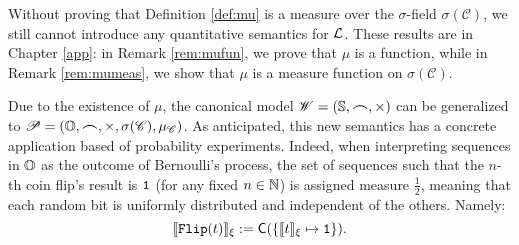 Without proving that Definition \ref{def:mu} is a measure over the $\sigma$-field
$\sigma(\mathscr C)$, we still cannot introduce any quantitative semantics for
$\mathcal{L}$.
These results are in Chapter \ref{app}:
in Remark \ref{rem:mufun}, we prove that $\mu$ is a function, while in
Remark \ref{rem:mumeas}, we show that $\mu$ is a measure function on $\sigma(\mathscr C)$.


Due to the existence of $\mu$, the canonical model $\mathscr{W}=(\mathbb{S},\bm{\frown},\times)$
can be generalized to
$\mathscr{P}=(\mathbb{O}, \bm{\frown},\times, \sigma(\mathscr{C}),
\mu_\mathscr{C})$.
As anticipated, this new semantics has a concrete application
based of probability experiments. Indeed,
when interpreting
sequences in $\mathbb{O}$
as the outcome of Bernoulli's process,
the set of sequences such that
the $n$-th
coin flip's result is
$\mathtt{1}$ (for any fixed $n\in \mathbb{N}$)
is assigned measure
$\frac{1}{2}$,
meaning that each random bit is uniformly
distributed and independent of the
others. Namely:
$$
\llbracket \mathtt{Flip}(t)\rrbracket_\xi := \mathsf C(\{\llbracket t\rrbracket_\xi\mapsto \mathtt{1}\}).
$$


